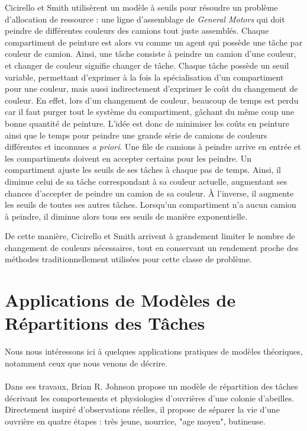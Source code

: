         Cicirello et Smith \cite{cicirello_wasp-like_2004} utilisèrent un modèle à seuils pour résoudre un problème d'allocation de ressource : une ligne d'assemblage de \textit{General Motors} qui doit peindre de différentes couleurs des camions tout juste assemblés. Chaque compartiment de peinture est alors vu comme un agent qui possède une tâche par couleur de camion. Ainsi, une tâche consiste à peindre un camion d'une couleur, et changer de couleur signifie changer de tâche. Chaque tâche possède un seuil variable, permettant d'exprimer à la fois la spécialisation d'un compartiment pour une couleur, mais aussi indirectement d'exprimer le coût du changement de couleur. En effet, lors d'un changement de couleur, beaucoup de temps est perdu car il faut purger tout le système du compartiment, gâchant du même coup une bonne quantité de peinture. L'idée est donc de minimiser les coûts en peinture ainsi que le temps pour peindre une grande série de camions de couleurs différentes et inconnues \textit{a priori}. Une file de camions à peindre arrive en entrée et les compartiments doivent en accepter certains pour les peindre. Un compartiment ajuste les seuils de ses tâches à chaque pas de temps. Ainsi, il diminue celui de sa tâche correspondant à sa couleur actuelle, augmentant ses chances d'accepter de peindre un camion de sa couleur. À l'inverse, il augmente les seuils de toutes ses autres tâches. Lorsqu'un compartiment n'a aucun camion à peindre, il diminue alors tous ses seuils de manière exponentielle.
        
        De cette manière, Cicirello et Smith arrivent à grandement limiter le nombre de changement de couleurs nécessaires, tout en conservant un rendement proche des méthodes traditionnellement utilisées pour cette classe de problème.
        
        
        \section{Applications de Modèles de Répartitions des Tâches}
        \label{sectionAppli}
        Nous nous intéressons ici à quelques applications pratiques de modèles théoriques, notamment ceux que nous venons de décrire. 
        
        \paragraph{}
        Dans ses travaux, Brian R. Johnson \cite{johnson_division_2010} propose un modèle de répartition des tâches décrivant les comportements et physiologies d'ouvrières d'une colonie d'abeilles. Directement inspiré d'observations réelles, il propose de séparer la vie d'une ouvrière en quatre étapes : très jeune, nourrice, "age moyen", butineuse. 
        
